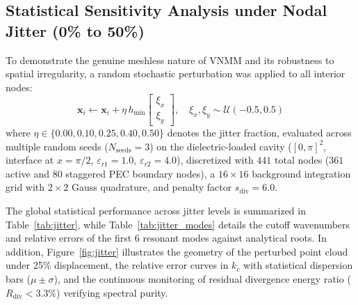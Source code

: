 \documentclass[11pt,a4paper]{article}
\begin{document}
\subsection{Statistical Sensitivity Analysis under Nodal Jitter (0\% to 50\%)}
To demonstrate the genuine meshless nature of VNMM and its robustness to spatial irregularity, a random stochastic perturbation was applied to all interior nodes:
\begin{equation}
\mathbf{x}_i \leftarrow \mathbf{x}_i + \eta \, h_{\min} \begin{bmatrix} \xi_x \\ \xi_y \end{bmatrix}, \quad \xi_x, \xi_y \sim \mathcal{U}(-0.5, 0.5)
\end{equation}
where $\eta \in \{0.00, 0.10, 0.25, 0.40, 0.50\}$ denotes the jitter fraction, evaluated across multiple random seeds ($N_{\mathrm{seeds}} = 3$) on the dielectric-loaded cavity ($[0, \pi]^2$, interface at $x = \pi/2$, $\varepsilon_{r1}=1.0$, $\varepsilon_{r2}=4.0$), discretized with $441$ total nodes ($361$ active and $80$ staggered PEC boundary nodes), a $16 \times 16$ background integration grid with $2 \times 2$ Gauss quadrature, and penalty factor $s_{\mathrm{div}} = 6.0$.

The global statistical performance across jitter levels is summarized in Table~\ref{tab:jitter}, while Table~\ref{tab:jitter_modes} details the cutoff wavenumbers and relative errors of the first 6 resonant modes against analytical roots. In addition, Figure~\ref{fig:jitter} illustrates the geometry of the perturbed point cloud under 25\% displacement, the relative error curves in $k_c$ with statistical dispersion bars ($\mu \pm \sigma$), and the continuous monitoring of residual divergence energy ratio ($R_{\mathrm{div}} < 3.3\%$) verifying spectral purity.
\end{document}
